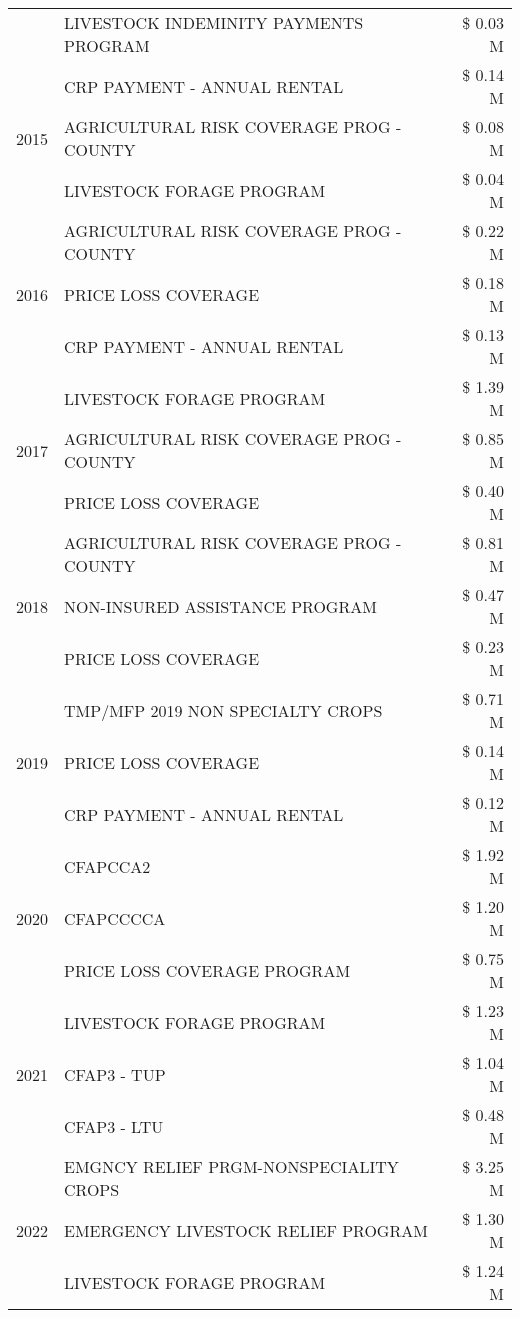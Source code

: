 \begin{tabular}{llr}
 & LIVESTOCK INDEMINITY PAYMENTS PROGRAM & \$ 0.03 M \\
\cline{1-3}
\multirow[t]{3}{*}{2015} & CRP PAYMENT - ANNUAL RENTAL & \$ 0.14 M \\
 & AGRICULTURAL RISK COVERAGE PROG - COUNTY & \$ 0.08 M \\
 & LIVESTOCK FORAGE PROGRAM & \$ 0.04 M \\
\cline{1-3}
\multirow[t]{3}{*}{2016} & AGRICULTURAL RISK COVERAGE PROG - COUNTY & \$ 0.22 M \\
 & PRICE LOSS COVERAGE & \$ 0.18 M \\
 & CRP PAYMENT - ANNUAL RENTAL & \$ 0.13 M \\
\cline{1-3}
\multirow[t]{3}{*}{2017} & LIVESTOCK FORAGE PROGRAM & \$ 1.39 M \\
 & AGRICULTURAL RISK COVERAGE PROG - COUNTY & \$ 0.85 M \\
 & PRICE LOSS COVERAGE & \$ 0.40 M \\
\cline{1-3}
\multirow[t]{3}{*}{2018} & AGRICULTURAL RISK COVERAGE PROG - COUNTY & \$ 0.81 M \\
 & NON-INSURED ASSISTANCE PROGRAM & \$ 0.47 M \\
 & PRICE LOSS COVERAGE & \$ 0.23 M \\
\cline{1-3}
\multirow[t]{3}{*}{2019} & TMP/MFP 2019 NON SPECIALTY CROPS & \$ 0.71 M \\
 & PRICE LOSS COVERAGE & \$ 0.14 M \\
 & CRP PAYMENT - ANNUAL RENTAL & \$ 0.12 M \\
\cline{1-3}
\multirow[t]{3}{*}{2020} & CFAPCCA2 & \$ 1.92 M \\
 & CFAPCCCCA & \$ 1.20 M \\
 & PRICE LOSS COVERAGE PROGRAM & \$ 0.75 M \\
\cline{1-3}
\multirow[t]{3}{*}{2021} & LIVESTOCK FORAGE PROGRAM & \$ 1.23 M \\
 & CFAP3 - TUP & \$ 1.04 M \\
 & CFAP3 - LTU & \$ 0.48 M \\
\cline{1-3}
\multirow[t]{3}{*}{2022} & EMGNCY RELIEF PRGM-NONSPECIALITY CROPS & \$ 3.25 M \\
 & EMERGENCY LIVESTOCK RELIEF PROGRAM & \$ 1.30 M \\
 & LIVESTOCK FORAGE PROGRAM & \$ 1.24 M \\
\cline{1-3}
\bottomrule
\end{tabular}
